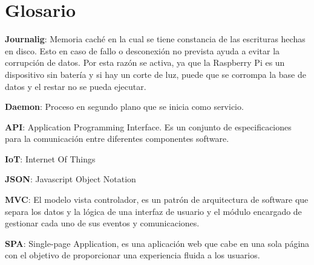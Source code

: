 \chapter*{Glosario}

{\bf Journalig}: Memoria caché en la cual se tiene constancia de las escrituras hechas en disco. Esto en caso de fallo o desconexión no prevista ayuda a evitar la corrupción de datos. Por esta razón se activa, ya que la Raspberry Pi es un dispositivo sin batería y si hay un corte de luz, puede que se corrompa la base de datos y el restar no se pueda ejecutar. 

{\bf Daemon}: Proceso en segundo plano que se inicia como servicio.

{\bf API}: Application Programming Interface. Es un conjunto de especificaciones
para la comunicación entre diferentes componentes software.

{\bf IoT}: Internet Of Things

{\bf JSON}: Javascript Object Notation

{\bf MVC}: El modelo vista controlador, es un patrón de arquitectura de software que separa los
datos y la lógica de una interfaz de usuario y el módulo encargado de gestionar cada uno de sus
eventos y comunicaciones.

{\bf SPA}: Single-page Application, es una aplicación web que cabe en una sola página con el
objetivo de proporcionar una experiencia fluida a los usuarios.

